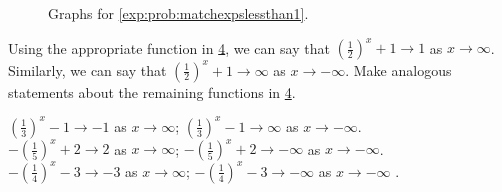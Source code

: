 \begin{exercises}
\begin{problem}
\begin{figure}[!htb]
\begin{widepage}
\begin{subfigure}{\figurewidth}
		\caption{}
		\label{exp:fig:matchexpsbaselt12}
	\end{subfigure}
	\hfill
	\begin{subfigure}{\figurewidth}
		\caption{}
		\label{exp:fig:matchexpsbaselt13}
	\end{subfigure}
	\hfill
	\begin{subfigure}{\figurewidth}
		\caption{}
		\label{exp:fig:matchexpsbaselt14}
	\end{subfigure}
	\caption{Graphs for \cref{exp:prob:matchexpslessthan1}.}
	\label{exp:fig:matchexpslessthan1}
	\end{widepage}
\end{figure}
\begin{subproblem}\label{exp:prob:asymptoteslt1}
	Using the appropriate function in \cref{exp:fig:matchexpslessthan1},
	we can say that $\left( \frac{1}{2} \right)^x+1\to 1$ as $x\to\infty$.
	Similarly, we can say that $\left( \frac{1}{2} \right)^x+1\to \infty$ as $x\to-\infty$.
	Make analogous statements about the remaining functions in \cref{exp:fig:matchexpslessthan1}.
	\begin{shortsolution}
		$\left(\frac{1}{3}\right)^x-1 \to   -1$ as $x\to\infty$; $\left(\frac{1}{3}\right)^x-1 \to \infty$ as $x\to-\infty$.\\ 
		$-\left(\frac{1}{5}\right)^x+2\to   2$ as $x\to\infty$;  $-\left(\frac{1}{5}\right)^x+2\to -\infty$ as $x\to-\infty$.\\ 
		$-\left(\frac{1}{4}\right)^x-3\to -3$  as $x\to\infty$;  $-\left(\frac{1}{4}\right)^x-3\to -\infty$  as $x\to-\infty$ .
	\end{shortsolution}
\end{subproblem}
\begin{subproblem}

\end{subproblem}
\end{problem}
\end{exercises}
